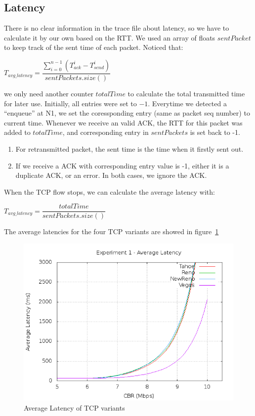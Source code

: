 \documentclass[10pt, conference]{lib/IEEEtran}
\begin{document}
\subsection{Latency}
There is no clear information in the trace file about latency, so we 
have to calculate it by our own based on the RTT. We used an array of 
floats $sentPacket$ to keep track of the sent time of each packet. 
Noticed that:
\begin{center}
    $T_{avg\_latency} = \dfrac{\sum_{i = 0}^{n - 1} (T_{ack}^i - T_{send}^i)}{sentPackets.size()}$
\end{center}
we only need another counter $totalTime$ to calculate the total transmitted time 
for later use.
Initially, all entries were set to $-1$. Everytime we detected a 
``enqueue'' at N1, we set the coressponding entry (same as packet seq 
number) to current time. Whenever we receive an valid ACK, the RTT for 
this packet was added to $totalTime$, and corresponding entry in 
$sentPackets$ is set back to -1. 
\begin{enumerate}
    \item For retransmitted packet, the sent time is the time when it firstly sent out.
    \item If we receive a ACK with corresponding entry value is -1, either it is a duplicate ACK, or an error. In both cases, we ignore the ACK.
\end{enumerate}
When the TCP flow stops, we can calculate the average latency with:
\begin{center}
    $T_{avg\_latency} = \dfrac{totalTime}{sentPackets.size()}$
\end{center}
The average latencies for the four TCP variants are showed in figure~\ref{fig:exp1_lt}
\begin{figure}[!htb]
    \centering
    \includegraphics[width=0.9\linewidth]{plot/exp1-lt.png}
    \caption{Average Latency of TCP variants}
    \label{fig:exp1_lt}
\end{figure}
\end{document}
